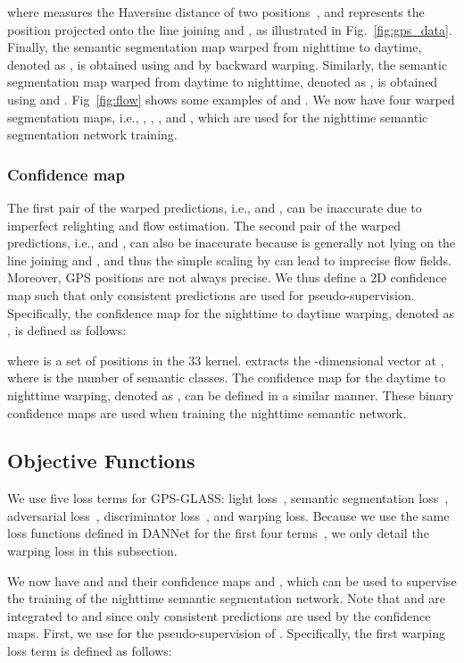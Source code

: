 \documentclass[10pt,twocolumn,letterpaper]{article}
\begin{document}
where  measures the Haversine distance of two positions~\cite{inman1849haver}, and  represents the position projected onto the line joining  and , as illustrated in Fig.~\ref{fig:gps_data}. Finally, the semantic segmentation map warped from nighttime to daytime, denoted as , is obtained using  and  by backward warping. Similarly, the semantic segmentation map warped from daytime to nighttime, denoted as , is obtained using  and . Fig~\ref{fig:flow} shows some examples of  and . We now have four warped segmentation maps, i.e., , , , and , which are used for the nighttime semantic segmentation network training.


\subsubsection{Confidence map}

The first pair of the warped predictions, i.e.,  and , can be inaccurate due to imperfect relighting and flow estimation. The second pair of the warped predictions, i.e.,  and , can also be inaccurate because  is generally not lying on the line joining  and , and thus the simple scaling by  can lead to imprecise flow fields. Moreover, GPS positions are not always precise. We thus define a 2D confidence map such that only consistent predictions are used for pseudo-supervision. Specifically, the confidence map for the nighttime to daytime warping, denoted as , is defined as follows:


where  is a set of positions in the 33 kernel.  extracts the -dimensional vector at , where  is the number of semantic classes. The confidence map for the daytime to nighttime warping, denoted as , can be defined in a similar manner. These binary confidence maps are used when training the nighttime semantic network.

\subsection{Objective Functions}
We use five loss terms for GPS-GLASS: light loss~, semantic segmentation loss~, adversarial loss~, discriminator loss~, and warping loss. Because we use the same loss functions defined in DANNet for the first four terms~\cite{wu2021dannet}, we only detail the warping loss in this subsection. 

We now have  and  and their confidence maps  and , which can be used to supervise the training of the nighttime semantic segmentation network. Note that  and  are integrated to  and  since only consistent predictions are used by the confidence maps. First, we use  for the pseudo-supervision of . Specifically, the first warping loss term  is defined as follows:
\end{document}
